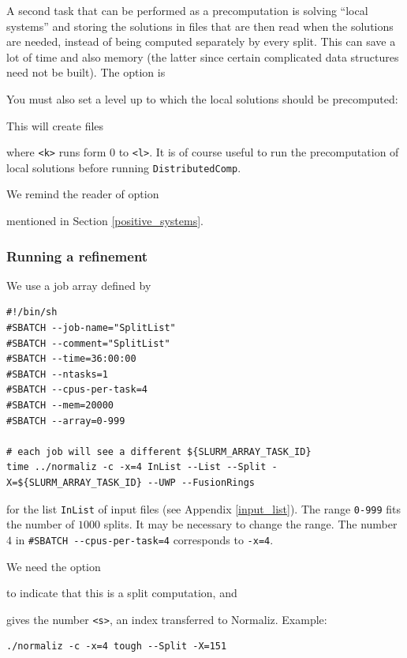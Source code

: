 A second task that can be performed as a precomputation is solving ``local systems'' and storing the solutions in files that are then read when the solutions are needed, instead of being computed separately by every split. This can save a lot of time and also memory (the latter since certain complicated data structures need not be built). The option is
\begin{itemize}
\end{itemize}
You must also set a level up to which the local solutions should be precomputed:
\begin{itemize}
\end{itemize}
This will create files
\begin{itemize}
\end{itemize}
where \verb*|<k>| runs form $0$ to \verb*|<l>|. It is of course useful to run the precomputation of local solutions before running \verb*|DistributedComp|.

We remind the reader of  option
\begin{itemize}
	\itemtt[ShortInt]
\end{itemize}
mentioned in Section \ref{positive_systems}.

\subsubsection {Running a refinement}

We use a job array defined by 
\begin{Verbatim}
#!/bin/sh
#SBATCH --job-name="SplitList"
#SBATCH --comment="SplitList"
#SBATCH --time=36:00:00
#SBATCH --ntasks=1
#SBATCH --cpus-per-task=4
#SBATCH --mem=20000
#SBATCH --array=0-999

# each job will see a different ${SLURM_ARRAY_TASK_ID}
time ../normaliz -c -x=4 InList --List --Split -X=${SLURM_ARRAY_TASK_ID} --UWP --FusionRings
\end{Verbatim}
for the  list \verb*|InList| of input files (see Appendix \ref{input_list}). The range \verb*|0-999| fits the number of $1000$ splits. It may be necessary to change the range. The number $4$ in \verb|#SBATCH --cpus-per-task=4| corresponds to \verb*|-x=4|.

We need the option
\begin{itemize}
\end{itemize}
to indicate that this is a split computation, and 
\begin{itemize}
\end{itemize}
gives the number \verb*|<s>|, an index transferred to Normaliz. Example:
\begin{Verbatim}
./normaliz -c -x=4 tough --Split -X=151
\end{Verbatim}

